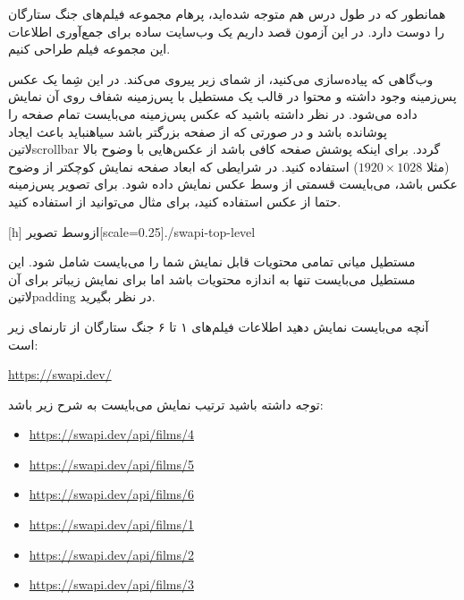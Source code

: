 
همانطور که در طول درس هم متوجه شده‌اید، پرهام مجموعه فیلم‌های جنگ ستارگان را دوست دارد.
در این آزمون قصد داریم یک وب‌سایت ساده برای جمع‌آوری اطلاعات این مجموعه فیلم طراحی کنیم.

وب‌گاهی که پیاده‌سازی می‌کنید، از شمای زیر پیروی می‌کند. در این شِما یک عکس پس‌زمینه وجود داشته و محتوا در قالب یک مستطیل با پس‌زمینه شفاف روی آن نمایش داده می‌شود.
در نظر داشته باشید که عکس پس‌زمینه می‌بایست تمام صفحه را پوشانده باشد و در صورتی که از صفحه بزرگتر باشد ‌سیاه{نباید} باعث ایجاد ‌لاتین{scrollbar} گردد.
برای اینکه پوشش صفحه کافی باشد از عکس‌هایی با وضوح بالا (مثلا $1920 \times 1028$) استفاده کنید.
در شرایطی که ابعاد صفحه نمایش کوچکتر از وضوح عکس باشد، می‌بایست قسمتی از وسط عکس نمایش داده شود.
برای تصویر پس‌زمینه حتما از عکس استفاده کنید، برای مثال می‌توانید از  استفاده کنید.

[h]
  ‌ازوسط
  ‌تصویر[scale=0.25]{./swapi-top-level}

مستطیل میانی تمامی محتویات قابل نمایش شما را می‌بایست شامل شود. این مستطیل می‌بایست تنها به اندازه محتویات باشد اما
برای نمایش زیباتر برای آن ‌لاتین{padding} در نظر بگیرید.


آنچه می‌بایست نمایش دهید اطلاعات فیلم‌های ۱ تا ۶ جنگ ستارگان از تارنمای زیر است:

\begin{latin}
  \url{https://swapi.dev/}
\end{latin}

توجه داشته باشید ترتیب نمایش می‌بایست به شرح زیر باشد:

\begin{latin}\begin{itemize}
  \item \url{https://swapi.dev/api/films/4}
  \item \url{https://swapi.dev/api/films/5}
  \item \url{https://swapi.dev/api/films/6}
  \item \url{https://swapi.dev/api/films/1}
  \item \url{https://swapi.dev/api/films/2}
  \item \url{https://swapi.dev/api/films/3}
\end{itemize}\end{latin}

